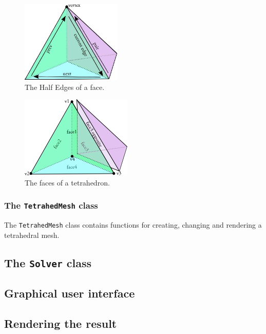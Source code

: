 \documentclass[10pt,a4paper]{article}
\begin{document}
\begin{figure}[htbp]
\label{fig:tetraedge}
\begin{center}
\includegraphics[scale=1]{figures/tetra_edge}
\caption{The Half Edges of a face.}
\end{center}
\end{figure}

\begin{figure}[htbp]
\label{fig:tetraface}
\begin{center}
\includegraphics[scale=1]{figures/tetra_face}
\caption{The faces of a tetrahedron.}
\end{center}
\end{figure}


\subsubsection{The \texttt{TetrahedMesh} class}
The \texttt{TetrahedMesh} class contains functions for creating, changing and rendering a tetrahedral mesh.

\subsection{The \texttt{Solver} class}



\subsection{Graphical user interface}

\subsection{Rendering the result}
\end{document}
